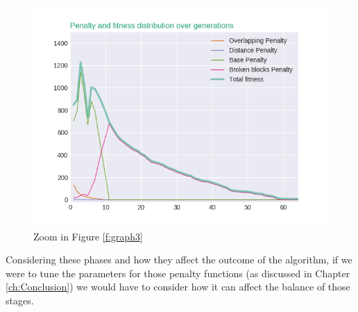 \begin{figure}[H]
	\centering
	\includegraphics[scale=0.6]{gfx/penalty_evolution_lines_zoom.png}
	\caption{Zoom in Figure \ref{f:graph3}}\label{f:graph4}
\end{figure}

Considering these phases and how they affect the outcome of the algorithm, if we were to tune the parameters for those penalty functions (as discussed in Chapter \ref{ch:Conclusion}) we would have to consider how it can affect the balance of those stages.

